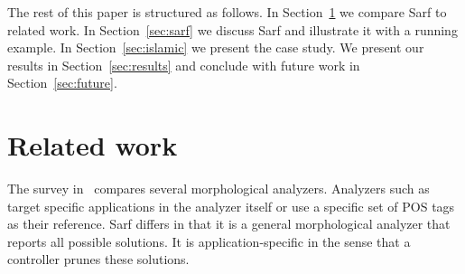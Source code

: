 \documentclass[11pt]{article}
\begin{document}
The rest of this paper is structured as follows. In Section~\ref{sec:related}
we compare Sarf to related work. In Section~\ref{sec:sarf}
we discuss Sarf and illustrate it with a running example.
In Section~\ref{sec:islamic} we present the case
study. We present our results in Section~\ref{sec:results}
and conclude with future work in Section~\ref{sec:future}.



\section{Related work }
\label{sec:related}

The survey in~\cite{Sughaiyer:04} compares
several morphological analyzers. 
Analyzers such as~\cite{Khoja:01,Darwish:02} 
target specific applications in the 
analyzer itself or use a specific set of POS tags
as their reference.
Sarf differs in that it is a general morphological 
analyzer that reports all possible solutions. 
It is application-specific in the sense that a controller 
prunes these solutions. 
\end{document}

